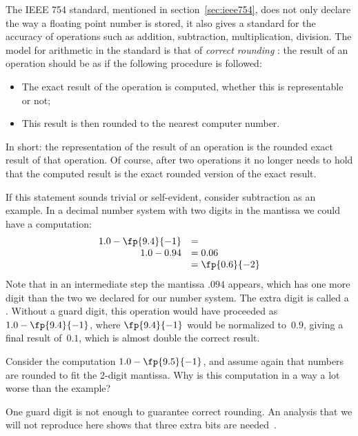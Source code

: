 The IEEE 754 standard, mentioned in section~\ref{sec:ieee754}, does
not only declare the way a floating point number is stored, it also
gives a standard for the accuracy of operations such as addition,
subtraction, multiplication, division. The model for arithmetic in the
standard is that of \emph{correct rounding}%
%
%
:
the result of an
operation should be as if the following procedure is followed:
\begin{itemize}
\item The exact result of the operation is computed, whether this is
  representable or not;
\item This result is then rounded to the nearest computer number.
\end{itemize}
In short: the representation of the result of an
operation is the rounded exact result of that operation.
Of course,
after two operations it no longer needs to hold that the computed
result is the exact rounded version of the exact result.

If this statement sounds trivial or self-evident, consider subtraction
as an example. In a decimal number system with two digits in the
mantissa we could have a computation:
\begin{equation}
\begin{array}{rl}
  1.0-\fp{9.4}{-1}&=\\ 1.0-0.94&=0.06\\&=\fp{0.6}{-2}\\
\end{array}
\end{equation}
Note that in an
intermediate step the mantissa $.094$ appears, which has one more
digit than the two we declared for our number system. The extra digit
is called a .
%
Without a guard digit, this operation would have proceeded as
$1.0-\fp{9.4}{-1}$, where $\fp{9.4}{-1}$ would be normalized to~$0.9$,
giving a final result of~$0.1$, which is almost double the correct result.

\begin{exercise}
  Consider the computation $1.0-\fp{9.5}{-1}$, and assume again that
  numbers are rounded to fit the 2-digit mantissa. Why is this
  computation in a way a lot worse than the example?
\end{exercise}
One guard digit is not enough to guarantee correct rounding. An
analysis that we will not reproduce here shows that three extra bits
are needed~\cite{Goldberg:arithmetic}.

